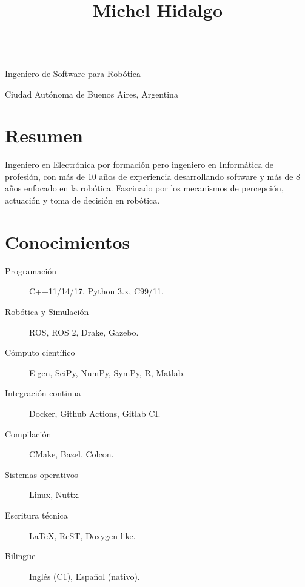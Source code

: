 \documentclass[spanish, letterpaper]{resume}
\begin{document}
\begin{center}
  \title{Michel Hidalgo} \\
  Ingeniero de Software para Robótica \\
  \address{Buenos Aires}{
    Ciudad Autónoma de Buenos Aires,
    Argentina} \\
  \begin{inlined}
    \item {}
    \item {}
    \item {}
  \end{inlined}
\end{center}

\section*{Resumen}

Ingeniero en Electrónica por formación pero ingeniero en Informática de profesión, con más de 10 años de experiencia desarrollando software y más de 8 años enfocado en la robótica. Fascinado por los mecanismos de percepción, actuación y toma de decisión en robótica.

\section*{Conocimientos}

\hfill
\begin{minipage}{0.55\linewidth}
  \begin{description}
    \item[Programación] C++11/14/17, Python 3.x, C99/11.
    \item[Robótica y Simulación] ROS, ROS 2, Drake, Gazebo.
    \item[Cómputo científico] Eigen, SciPy, NumPy, SymPy, R, Matlab.
    \item[Integración continua] Docker, Github Actions, Gitlab CI.
  \end{description}
\end{minipage}\hfill
\begin{minipage}{0.4\linewidth}
  \begin{description}
    \item[Compilación] CMake, Bazel, Colcon.
    \item[Sistemas operativos] Linux, Nuttx.
    \item[Escritura técnica] La\TeX, ReST, Doxygen-like.
    \item[Bilingüe] Inglés (C1), Español (nativo).
  \end{description}
\end{minipage}
\hfill
\end{document}
